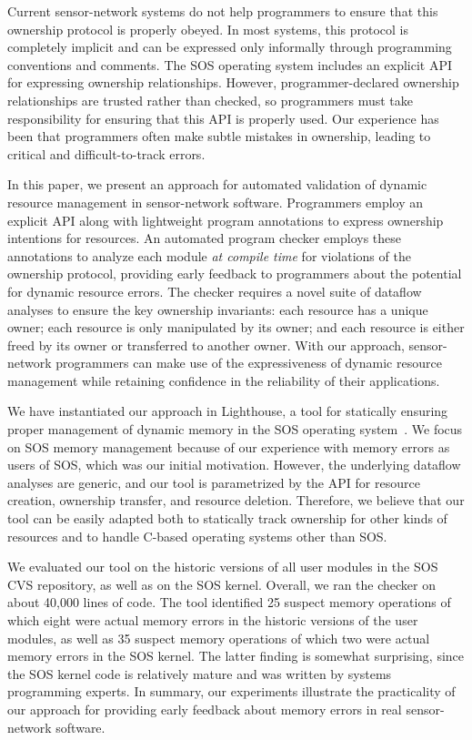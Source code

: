 Current sensor-network systems do not help programmers to ensure that
this ownership protocol is properly obeyed.  In most systems, this
protocol is completely implicit and can be expressed only informally
through programming conventions and comments.  The SOS operating
system includes an explicit API for expressing ownership
relationships.  However, programmer-declared ownership relationships
are trusted rather than checked, so programmers must take responsibility for
ensuring that this API is properly used.  Our experience has been that
programmers often make subtle mistakes in ownership,
leading to critical and difficult-to-track errors.  

In this paper, we present an approach for automated validation of dynamic
resource management in sensor-network software.  Programmers employ an
explicit API along with lightweight program annotations to express
ownership intentions for resources.  An automated program checker employs these
annotations to analyze each module {\em
at compile time} for violations of the ownership protocol, providing
early feedback to programmers about the potential for dynamic resource
errors.  The checker requires a novel suite of dataflow analyses to ensure
the key ownership invariants:  each resource has a unique owner; each
resource is only manipulated by its owner; and each resource is either
freed by its owner or transferred to another owner.  With our approach,
sensor-network programmers can make use of the expressiveness of
dynamic resource management while retaining confidence in the
reliability of their applications.

We have instantiated our approach in Lighthouse, a tool for statically ensuring
proper management of dynamic memory in the SOS operating
system~\cite{sos}. 
We focus on SOS memory management because of our experience with
memory errors as users of SOS, which was our initial motivation.
However, the underlying dataflow analyses are generic, and our tool is
parametrized by the API for resource creation, ownership transfer, and
resource deletion.  Therefore, we believe that our tool can be easily
adapted both to statically track ownership for other kinds of
resources and to handle C-based operating systems other than SOS.

We evaluated our tool on the historic versions of all user modules in
the SOS CVS repository, as well as on the SOS kernel.  Overall, we ran
the checker on about 40,000 lines of code.  The tool identified 25
suspect memory operations of which eight were actual memory errors in the
historic versions of the user modules, as well as 35 suspect memory
operations of which two were actual memory errors in the SOS kernel.
The latter finding is somewhat surprising, since the SOS kernel code
is relatively mature and was written by systems programming experts.
In summary, our experiments illustrate the practicality of our
approach for providing early feedback about memory errors in real
sensor-network software.

